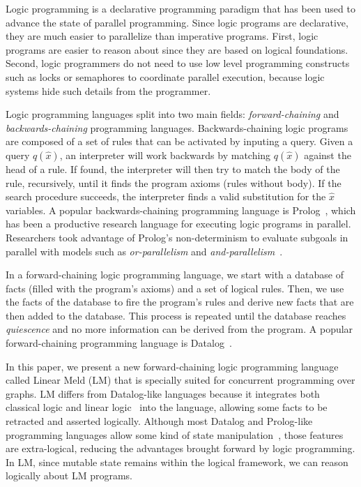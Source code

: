 Logic programming is a declarative programming paradigm that has been used to advance the state of parallel programming.
Since logic programs are declarative, they are much easier to parallelize than imperative programs.
First, logic programs are easier to reason about since they are based on logical foundations.
Second, logic programmers do not need to use low level programming constructs such as locks or semaphores to
coordinate parallel execution, because logic systems hide such details from the programmer.

Logic programming languages split into two main fields: \emph{forward-chaining} and \emph{backwards-chaining} 
programming languages. Backwards-chaining logic programs are composed of a set of rules that can be activated by inputing a query. Given a query $q(\hat{x})$, an interpreter will work backwards by matching $q(\hat{x})$ against the head of a rule. If found, the interpreter will then try to match the body of the rule, recursively, until it finds the program axioms (rules without body). If the search procedure succeeds, the interpreter finds a valid substitution for the $\hat{x}$ variables. A popular backwards-chaining programming
language is Prolog~\cite{Colmerauer:1993:BP:154766.155362}, which has been a productive research language for executing logic
programs in parallel. Researchers took advantage of Prolog's non-determinism to evaluate subgoals
in parallel with models such as \emph{or-parallelism} and \emph{and-parallelism}~\cite{Gupta:2001:PEP:504083.504085}.

In a forward-chaining logic programming language, we start with a database of facts (filled with the program's
axioms) and a set of logical rules. Then, we use the facts of the database to fire the program's rules and derive new facts that are
then added to the database. This process is repeated until the database reaches \emph{quiescence} and no more information can
be derived from the program.
A popular forward-chaining programming language is Datalog~\cite{Ramakrishnan93asurvey}.

In this paper, we present a new forward-chaining logic programming language called Linear Meld (LM) that is specially suited
for concurrent programming over graphs. LM differs from Datalog-like languages because it integrates both classical
logic and linear logic~\cite{girard-87} into the language, allowing some facts to be retracted and asserted logically. Although most
Datalog and Prolog-like programming languages allow some kind of state manipulation~\cite{Liu98extendingdatalog}, those features
are extra-logical, reducing the advantages brought forward by logic programming.
In LM, since mutable state remains within the logical framework, we can reason logically about LM programs.


